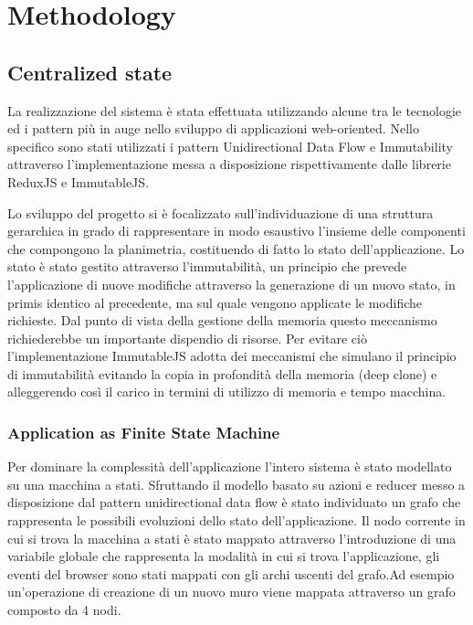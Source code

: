 \section{Methodology}

\subsection{Centralized state}
La realizzazione del sistema è stata effettuata utilizzando alcune tra le tecnologie ed i pattern più in auge nello sviluppo di applicazioni web-oriented. Nello specifico sono stati utilizzati i pattern Unidirectional Data Flow e Immutability attraverso l’implementazione messa a disposizione rispettivamente dalle librerie ReduxJS e ImmutableJS.


Lo sviluppo del progetto si è focalizzato sull'individuazione di una struttura gerarchica in grado di rappresentare in modo esaustivo l’insieme delle componenti che compongono la planimetria, costituendo di fatto lo stato dell’applicazione. Lo stato è stato gestito attraverso l’immutabilit\`a, un principio che prevede l’applicazione di nuove modifiche attraverso la generazione di un nuovo stato, in primis identico al precedente, ma sul quale vengono applicate le modifiche richieste. Dal punto di vista della gestione della memoria questo meccanismo richiederebbe un importante dispendio di risorse. Per evitare ciò l’implementazione ImmutableJS adotta dei meccanismi che simulano il principio di immutabilit\`a evitando la copia in profondit\`a della memoria  (deep clone) e alleggerendo così il carico in termini di utilizzo di memoria e tempo macchina.


\subsubsection{Application as Finite State Machine}
Per dominare la complessit\`a dell’applicazione l’intero sistema è stato modellato su una macchina a stati. Sfruttando il modello basato su azioni e reducer messo a disposizione dal pattern unidirectional data flow è stato individuato un grafo che rappresenta le possibili evoluzioni dello stato dell’applicazione. Il nodo corrente in cui si trova la macchina a stati è stato mappato attraverso l’introduzione di una variabile globale che rappresenta la modalit\`a in cui si trova l’applicazione, gli eventi del browser sono stati mappati con gli archi uscenti del grafo.Ad esempio un’operazione di creazione di un nuovo muro viene mappata attraverso un grafo composto da 4 nodi.\newline

